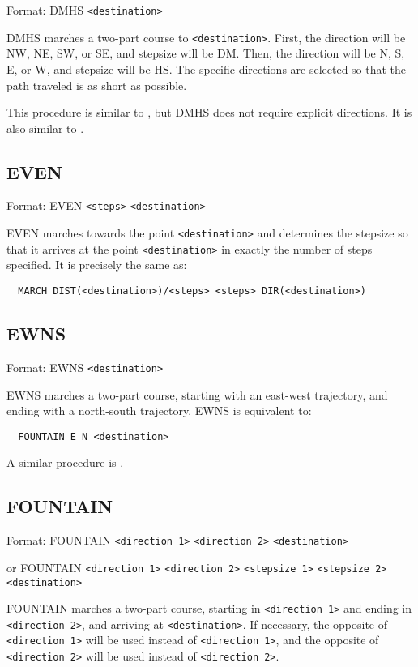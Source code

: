 Format: DMHS \verb$<destination>$

DMHS marches a two-part course to \verb$<destination>$.  First, the
direction will be NW, NE, SW, or SE, and stepsize will be DM.  Then,
the direction will be N, S, E, or W, and stepsize will be HS.  The
specific directions are selected so that the path traveled is as short
as possible.

This procedure is similar to , but DMHS does
not require explicit directions.  It is also similar to .

\subsection{EVEN}\label{even}

Format: EVEN \verb$<steps>$ \verb$<destination>$

EVEN marches towards the point \verb$<destination>$ and determines the
stepsize so that it arrives at the point \verb$<destination>$ in exactly
the number of steps specified.  It is precisely the same as:
\begin{verbatim}
  MARCH DIST(<destination>)/<steps> <steps> DIR(<destination>)
\end{verbatim}

\subsection{EWNS}\label{ewns}

Format: EWNS \verb$<destination>$

EWNS marches a two-part course, starting with an east-west trajectory, and
ending with a north-south trajectory.  EWNS is equivalent to:
\begin{verbatim}
  FOUNTAIN E N <destination>
\end{verbatim}

A similar procedure is .

\subsection{FOUNTAIN}\label{fountain}

Format: FOUNTAIN \verb$<direction 1>$ \verb$<direction 2>$ \verb$<destination>$

or FOUNTAIN \verb$<direction 1>$ \verb$<direction 2>$ \verb$<stepsize 1>$ \verb$<stepsize 2>$ \verb$<destination>$

FOUNTAIN marches a two-part course, starting in \verb$<direction 1>$ and
ending in \verb$<direction 2>$, and arriving at \verb$<destination>$.
If necessary, the opposite of \verb$<direction 1>$ will be used instead
of \verb$<direction 1>$, and the opposite of \verb$<direction 2>$ will
be used instead of \verb$<direction 2>$.

